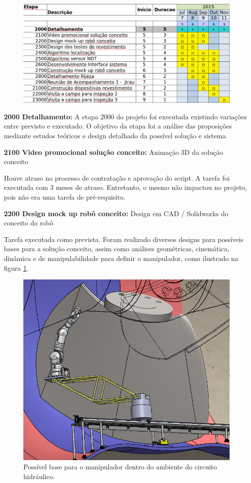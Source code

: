 \begin{figure}[H]
\centering
\includegraphics[width=0.9\columnwidth]{figs/etapa2}
\end{figure} 

\noindent
\textbf{2000 Detalhamento:} A etapa 2000 do projeto foi executada existindo
variações entre previsto e executado. O objetivo da etapa foi a análise das
proposições mediante estudos teóricos e design detalhado da possível solução e sistema

\noindent
\textbf{2100 Video promocional solução conceito:} Animação 3D da solução
conceito

Houve atraso no processo de contratação e aprovação do script. A tarefa foi
executada com 3 meses de atraso. Entretanto, o mesmo não impactou no projeto,
pois não era uma tarefa de pré-requisito.

\noindent
\textbf{2200 Design mock up robô conceito:} Design em CAD / Solidworks do
conceito do robô

Tarefa executada como prevista. Foram realizado diversos designs para possíveis
bases para a solução conceito, assim como análises geométricas, cinemática,
dinâmica e de manipulabilidade para definir o manipulador, como ilustrado na
figura \ref{fig::ex_cad}.

\begin{figure}
\centering
\label{fig::ex_cad}
\includegraphics[width=0.6\columnwidth]{figs/EMMA_Base_Conceito_PRR}
\caption{Possível base para o manipulador dentro do ambiente do circuito
hidráulico.}
\end{figure} 


